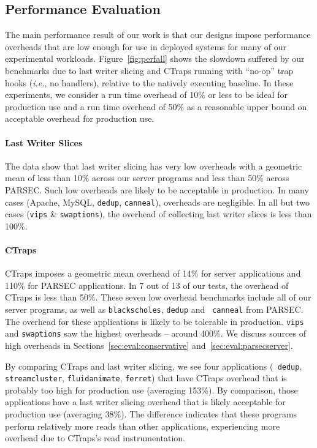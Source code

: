 \documentclass[preprint,9pt]{sigplanconf}
\newcommand{\ctraps}{CTraps\xspace}
\begin{document}
\subsection{Performance Evaluation}
\label{sec:eval:perf}

The main performance result of our work is that our designs impose performance
overheads that are low enough for use in deployed systems for many of our
experimental workloads.  Figure~\ref{fig:perfall} shows the slowdown suffered
by our benchmarks due to last writer slicing and \ctraps running with ``no-op''
trap hooks ({\em i.e.}, no handlers), relative to the natively executing
baseline.  In these experiments, we consider a run time overhead of 10\% or
less to be ideal for production use and a run time overhead of 50\% as
a reasonable upper bound on acceptable overhead for production use.

\paragraph{Last Writer Slices}
The data show that last writer slicing has very low overheads with a geometric
mean of less than 10\% across our server programs and less than 50\% across
PARSEC.  Such low overheads are likely to be acceptable in production.  In many
cases (Apache, MySQL, {\tt dedup}, {\tt canneal}), overheads are negligible.
In all but two cases ({\tt vips} \& {\tt swaptions}), the overhead of
collecting last writer slices is less than 100\%.    

\paragraph{\ctraps}
\ctraps imposes a geometric mean overhead of 14\% for server applications and
110\% for PARSEC applications.  In 7 out of 13 of our tests, the overhead of
\ctraps is less than 50\%.  These seven low overhead benchmarks include all of
our server programs, as well as {\tt blackscholes}, {\tt dedup} and {\tt
canneal} from PARSEC.  The overhead for these applications is likely to be
tolerable in production.  {\tt vips} and {\tt swaptions} saw the highest
overheads -- around 400\%.  We discuss sources of high overheads in
Sections~\ref{sec:eval:conservative} and~\ref{sec:eval:parsecserver}.

By comparing \ctraps and last writer slicing, we see four applications ({\tt
dedup}, {\tt streamcluster}, {\tt fluidanimate}, {\tt ferret}) that have
\ctraps overhead that is probably too high for production use (averaging
153\%).  By comparison, those applications have a last writer slicing overhead
that is likely acceptable for production use (averaging 38\%).  The difference
indicates that these programs perform relatively more reads than other
applications, experiencing more overhead due to \ctraps's read instrumentation.
\end{document}
